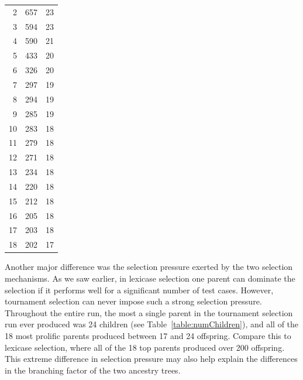 \begin{table}[tb]
{\begin{tabular}{rrr}
			2 & 657 & 23 \\
			3 & 594 & 23 \\
			4 & 590 & 21 \\
			5 & 433 & 20 \\
			6 & 326 & 20 \\
			7 & 297 & 19 \\
			8 & 294 & 19 \\
			9 & 285 & 19 \\
			10 & 283 & 18 \\
			11 & 279 & 18 \\
			12 & 271 & 18 \\
			13 & 234 & 18 \\
			14 & 220 & 18 \\
			15 & 212 & 18 \\
			16 & 205 & 18 \\
			17 & 203 & 18 \\
			18 & 202 & 17 \\
		\end{tabular}
		}%
\end{table}

Another major difference was the selection pressure exerted by the two selection mechanisms. 
As we saw earlier, in lexicase 
selection one parent can dominate the selection if it performs well for a significant number of test 
cases. However, tournament selection can never 
impose such a strong selection pressure. Throughout the entire run,
the most a single parent in the tournament selection run ever produced was 24 children 
(see Table~\ref{table:numChildren}), and all of the 18 most prolific parents produced between 17
and 24 offspring. Compare this to lexicase selection, where all of the 18 top parents produced over 
200 offspring. This extreme difference in selection pressure may also help explain the 
differences in the branching factor of the two ancestry trees.

